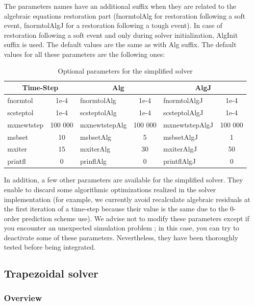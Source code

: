\documentclass[a4paper, 12pt]{report}
\begin{document}
The parameters names have an additional suffix when they are related to the algebraic equations restoration part (fnormtolAlg for restoration following a soft event, fnormtolAlgJ for a restoration following a tough event).
In case of restoration following a soft event and only during solver initialization, AlgInit suffix is used. The default values are the same as with Alg suffix.
The default values for all these parameters are the following ones:

\begin{table}[h!]
\center
\begin{tabular}{lc | lc | lc}
\toprule
\multicolumn{2}{c}{\textbf{Time-Step}} &
\multicolumn{2}{c}{\textbf{Alg}} &
\multicolumn{2}{c}{\textbf{AlgJ}} \\
\midrule
fnormtol & 1e-4 & fnormtolAlg & 1e-4 & fnormtolAlgJ & 1e-4 \\
scsteptol & 1e-4 & scsteptolAlg & 1e-4 & scsteptolAlgJ & 1e-4 \\
mxnewtstep & 100 000 & mxnewtstepAlg & 100 000 & mxnewtstepAlgJ & 100 000 \\
msbset & 10 & msbsetAlg & 5 & msbsetAlgJ & 1 \\
mxiter & 15 & mxiterAlg & 30 & mxiterAlgJ & 50 \\
printfl & 0 & prinflAlg & 0 & printflAlgJ & 0 \\
\bottomrule
\end{tabular}
\caption{Optional parameters for the simplified solver}
\label{OptionalParameters}
\end{table}

In addition, a few other parameters are available for the simplified solver. They enable to discard some algorithmic optimizations realized in the solver implementation (for example, we currently avoid recalculate algebraic residuals at the first iteration of a time-step because their value is the same due to the 0-order prediction scheme use). We advise not to modify these parameters except if you encounter an unexpected simulation problem ; in this case, you can try to deactivate some of these parameters. Nevertheless, they have been thoroughly tested before being integrated.

\subsection{Trapezoidal solver}
\label{Trapezoidal}

\subsubsection{Overview}
\end{document}
